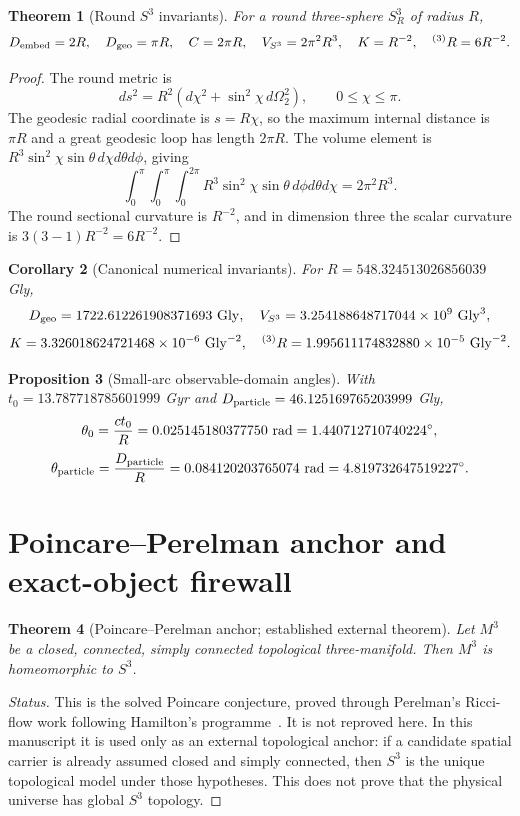 \documentclass[11pt,a4paper]{article}
\newtheorem{theorem}{Theorem}[section]
\newtheorem{proposition}[theorem]{Proposition}
\newtheorem{corollary}[theorem]{Corollary}
\begin{document}
\begin{theorem}[Round $S^3$ invariants]
For a round three-sphere $S^3_R$ of radius $R$,
\[
D_{\rm embed}=2R,
\quad
D_{\rm geo}=\pi R,
\quad
C=2\pi R,
\quad
V_{S^3}=2\pi^2R^3,
\quad
K=R^{-2},
\quad
{}^{(3)}R=6R^{-2}.
\]
\end{theorem}
\begin{proof}
The round metric is
\[
ds^2=R^2(d\chi^2+\sin^2\chi\,d\Omega_2^2),\qquad 0\le \chi\le \pi.
\]
The geodesic radial coordinate is $s=R\chi$, so the maximum internal distance is $\pi R$ and a great geodesic loop has length $2\pi R$.  The volume element is $R^3\sin^2\chi\sin\theta\,d\chi d\theta d\phi$, giving
\[
\int_0^\pi\int_0^\pi\int_0^{2\pi}R^3\sin^2\chi\sin\theta\,d\phi d\theta d\chi=2\pi^2R^3.
\]
The round sectional curvature is $R^{-2}$, and in dimension three the scalar curvature is $3(3-1)R^{-2}=6R^{-2}$.\end{proof}

\begin{corollary}[Canonical numerical invariants]
For $R=548.324513026856039$ Gly,
\[
D_{\rm geo}=1722.612261908371693\ {\rm Gly},
\quad
V_{S^3}=3.254188648717044\times10^9\ {\rm Gly}^3,
\]
\[
K=3.326018624721468\times10^{-6}\ {\rm Gly}^{-2},
\quad
{}^{(3)}R=1.995611174832880\times10^{-5}\ {\rm Gly}^{-2}.
\]
\end{corollary}

\begin{proposition}[Small-arc observable-domain angles]
With $t_0=13.787718785601999$ Gyr and $D_{\rm particle}=46.125169765203999$ Gly,
\[
\theta_0=\frac{ct_0}{R}=0.025145180377750\ {\rm rad}=1.440712710740224^\circ,
\]
\[
\theta_{\rm particle}=\frac{D_{\rm particle}}{R}=0.084120203765074\ {\rm rad}=4.819732647519227^\circ.
\]
\end{proposition}

\section{Poincare--Perelman anchor and exact-object firewall}

\begin{theorem}[Poincare--Perelman anchor; established external theorem]
Let $M^3$ be a closed, connected, simply connected topological three-manifold.  Then $M^3$ is homeomorphic to $S^3$.
\end{theorem}
\begin{proof}[Status]
This is the solved Poincare conjecture, proved through Perelman's Ricci-flow work following Hamilton's programme~\cite{Perelman2002,Perelman2003}.  It is not reproved here.  In this manuscript it is used only as an external topological anchor: if a candidate spatial carrier is already assumed closed and simply connected, then $S^3$ is the unique topological model under those hypotheses.  This does not prove that the physical universe has global $S^3$ topology.
\end{proof}
\end{document}
